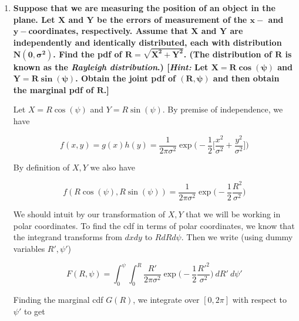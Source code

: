 \documentclass[10pt, oneside]{article}
\begin{document}
\begin{enumerate}[label=9.\arabic*]
Lastly we calculate

\begin{align*}
E[Y] &= \frac{2}{\sqrt{2 \pi}} \int^{+\infty}_0 y \exp \bigg( -\frac{y^2}{2} \bigg) \ dy = \boxed{\sqrt{\frac{2}{\pi}}} \\
E[Y^2] &= \frac{2}{\sqrt{2 \pi}} \int^{+\infty}_0 y^2 \exp \bigg( -\frac{y^2}{2} \bigg) \ dy = \frac{2}{\sqrt{2 \pi}} \frac{1}{2} \sqrt{2 \pi} = 1 \\
V[Y] &= E[Y^2] - E[Y]^2 = 1 - \frac{2}{\pi} = \boxed{\frac{\pi - 2}{\pi}}
\end{align*}

\item  \begin{tcolorbox}[
  colback=Cerulean!5!white,
  colframe=Cerulean!75!black]
\textbf{Suppose that we are measuring the position of an object in the plane. Let $\bm{X}$ and $\bm{Y}$ be the errors of measurement of the $\bm{x-}$ and $\bm{y-}$coordinates, respectively. Assume that $\bm{X}$ and $\bm{Y}$ are independently and identically distributed, each with distribution $\bm{N(0, \sigma^2)}$. Find the pdf of $\bm{R = \sqrt{X^2 + Y^2}}$. (The distribution of $\bm{R}$ is known as the \textit{Rayleigh distribution}.) [\textit{Hint:} Let $\bm{X = R\cos (\psi)}$ and $\bm{Y = R \sin (\psi)}$. Obtain the joint pdf of $\bm{(R, \psi)}$ and then obtain the marginal pdf of $\bm{R}$.]}
\end{tcolorbox}

Let $X = R \cos (\psi)$ and $Y = R \sin (\psi)$. By premise of independence, we have

\[ f(x,y) = g(x) h(y) = \frac{1}{2 \pi \sigma^2} \exp \bigg( -\frac{1}{2} \bigg[ \frac{x^2}{\sigma^2} + \frac{y^2}{\sigma^2} \bigg] \bigg) \]

By definition of $X, Y$ we also have

\[ f(R \cos (\psi), R \sin (\psi)) = \frac{1}{2 \pi \sigma^2} \exp \bigg( -\frac{1}{2} \frac{R^2}{\sigma^2} \bigg) \]

We should intuit by our transformation of $X, Y$ that we will be working in polar coordinates. To find the cdf in terms of polar coordinates, we know that the integrand transforms from $dx  dy$ to $R dR d \psi$. Then we write (using dummy variables $R', \psi'$)

\[ F(R, \psi) = \int^\psi_0 \int^R_0 \frac{R'}{2 \pi \sigma^2} \exp \bigg( -\frac{1}{2} \frac{R'^2}{\sigma^2} \bigg) \ dR' \ d \psi'  \]

Finding the marginal cdf $G(R)$, we integrate over $[0, 2 \pi]$ with respect to $\psi'$ to get


\end{enumerate}
\end{document}
